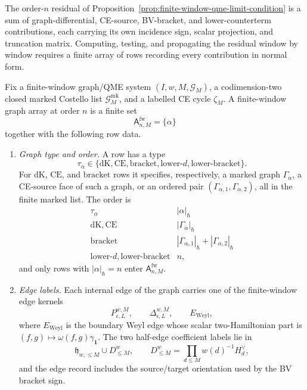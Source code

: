 The order-\(n\) residual of
Proposition~\ref{prop:finite-window-qme-limit-condition} is a sum of
graph-differential, CE-source, BV-bracket, and lower-counterterm
contributions, each carrying its own incidence sign, scalar projection,
and truncation matrix.  Computing, testing, and propagating the
residual window by window requires a finite array of rows recording
every contribution in normal form.

\begin{defn}\label{defn:finite-window-graph-array}
  Fix a finite-window graph/QME system
  \((I,w,M,\mathcal G_M)\), a codimension-two closed marked Costello list
  \(\mathcal G^{\mathrm{mk}}_M\), and a labelled CE cycle \(\zeta_M\).
  A finite-window graph array at order \(n\) is a finite set
  \[
    \mathsf A^{\mathrm{fw}}_{n,M}
      =
    \{\alpha\}
  \]
  together with the following row data.

  \begin{enumerate}[label=(A\arabic*)]
    \item \emph{Graph type and order.}  A row has a type
    \[
      \tau_\alpha\in
      \{\mathrm{dK},\mathrm{CE},\mathrm{bracket},
        \mathrm{lower}\text{-}d,\mathrm{lower}\text{-}\mathrm{bracket}\}.
    \]
    For \(\mathrm{dK}\), \(\mathrm{CE}\), and \(\mathrm{bracket}\) rows it
    specifies, respectively, a marked graph \(\Gamma_\alpha\), a CE-source
    face of such a graph, or an ordered pair
    \((\Gamma_{\alpha,1},\Gamma_{\alpha,2})\), all in the finite marked list.
    The order is
    \[
    \begin{array}{c|c}
      \tau_\alpha & |\alpha|_\hbar \\ \hline
      \mathrm{dK},\mathrm{CE} & |\Gamma_\alpha|_\hbar\\
      \mathrm{bracket} &
        |\Gamma_{\alpha,1}|_\hbar+|\Gamma_{\alpha,2}|_\hbar\\
      \mathrm{lower}\text{-}d,\mathrm{lower}\text{-}\mathrm{bracket} & n ,
    \end{array}
    \]
    and only rows with \(|\alpha|_\hbar=n\) enter
    \(\mathsf A^{\mathrm{fw}}_{n,M}\).

    \item \emph{Edge labels.}  Each internal edge of the graph carries one of
    the finite-window edge kernels
    \[
      P_{\epsilon,L}^{w,M},\qquad
      \Delta_{\epsilon,L}^{w,M},\qquad
      E_{\mathrm{Weyl}},
    \]
    where \(E_{\mathrm{Weyl}}\) is the boundary Weyl edge whose scalar
    two-Hamiltonian part is
    \((f,g)\mapsto\omega(f,g)\gamma_{\mathbf 1}\).  The two half-edge
    coefficient labels lie in
    \[
      \mathfrak h_{w,\leq M}\cup D^w_{\leq M},
      \qquad
      D^w_{\leq M}=\prod_{d\leq M}w(d)^{-1}H_d^\vee,
    \]
    and the edge record includes the source/target orientation used by the
    BV bracket sign.


\end{enumerate}
\end{defn}
